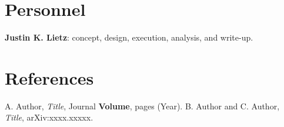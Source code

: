 \documentclass[11pt]{article}
\theoremstyle{plain}
\theoremstyle{remark}
\begin{document}
\section{Personnel}
\textbf{Justin K. Lietz}: concept, design, execution, analysis, and write-up.

\section{References}

\begin{thebibliography}{9}
 A. Author, \emph{Title}, Journal \textbf{Volume}, pages (Year).
 B. Author and C. Author, \emph{Title}, arXiv:xxxx.xxxxx.
\end{thebibliography}

\end{document}
